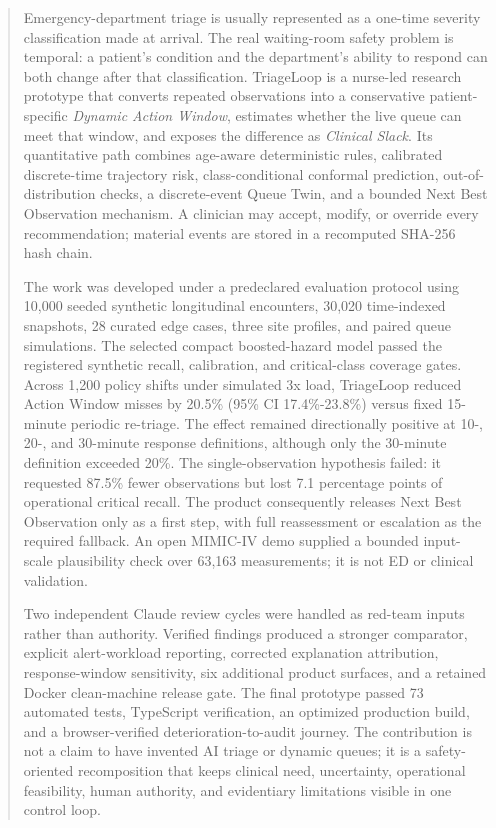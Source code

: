 \documentclass[11pt,a4paper]{article}
\begin{document}
\begin{abstract}
Emergency-department triage is usually represented as a one-time severity classification made at arrival. The real waiting-room safety problem is temporal: a patient's condition and the department's ability to respond can both change after that classification. TriageLoop is a nurse-led research prototype that converts repeated observations into a conservative patient-specific \emph{Dynamic Action Window}, estimates whether the live queue can meet that window, and exposes the difference as \emph{Clinical Slack}. Its quantitative path combines age-aware deterministic rules, calibrated discrete-time trajectory risk, class-conditional conformal prediction, out-of-distribution checks, a discrete-event Queue Twin, and a bounded Next Best Observation mechanism. A clinician may accept, modify, or override every recommendation; material events are stored in a recomputed SHA-256 hash chain.

The work was developed under a predeclared evaluation protocol using 10,000 seeded synthetic longitudinal encounters, 30,020 time-indexed snapshots, 28 curated edge cases, three site profiles, and paired queue simulations. The selected compact boosted-hazard model passed the registered synthetic recall, calibration, and critical-class coverage gates. Across 1,200 policy shifts under simulated 3x load, TriageLoop reduced Action Window misses by 20.5\% (95\% CI 17.4\%-23.8\%) versus fixed 15-minute periodic re-triage. The effect remained directionally positive at 10-, 20-, and 30-minute response definitions, although only the 30-minute definition exceeded 20\%. The single-observation hypothesis failed: it requested 87.5\% fewer observations but lost 7.1 percentage points of operational critical recall. The product consequently releases Next Best Observation only as a first step, with full reassessment or escalation as the required fallback. An open MIMIC-IV demo supplied a bounded input-scale plausibility check over 63,163 measurements; it is not ED or clinical validation.

Two independent Claude review cycles were handled as red-team inputs rather than authority. Verified findings produced a stronger comparator, explicit alert-workload reporting, corrected explanation attribution, response-window sensitivity, six additional product surfaces, and a retained Docker clean-machine release gate. The final prototype passed 73 automated tests, TypeScript verification, an optimized production build, and a browser-verified deterioration-to-audit journey. The contribution is not a claim to have invented AI triage or dynamic queues; it is a safety-oriented recomposition that keeps clinical need, uncertainty, operational feasibility, human authority, and evidentiary limitations visible in one control loop.
\end{abstract}
\end{document}
